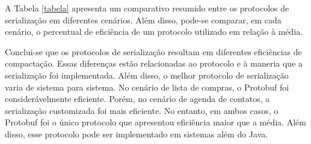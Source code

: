 \documentclass{article}
\begin{document}
A Tabela \ref{tabela} apresenta um comparativo resumido entre os protocolos de serialização em diferentes cenários. Além disso, pode-se comparar, em cada cenário, o percentual de eficiência de um protocolo utilizado em relação à média. 

\vbox{} Conclui-se que os protocolos de serialização resultam em diferentes eficiências de compactação. Essas diferenças estão relacionadas ao protocolo e à maneria que a serialização foi implementada. Além disso, o melhor protocolo de serialização varia de sistema para sistema. No cenário de lista de compras, o Protobuf foi considerávelmente eficiente. Porém, no cenário de 
agenda de contatos, a serialização customizada foi mais eficiente. No entanto, em ambos casos, o Protobuf foi o único protocolo que apresentou eficiência maior que a média. Além disso, esse protocolo pode ser implementado em sistemas além do Java.
\end{document}
